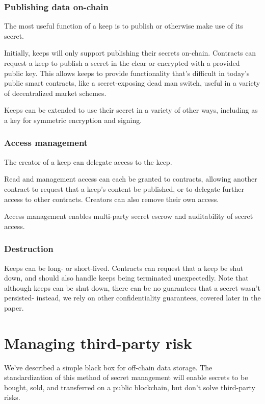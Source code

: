 \documentclass[11pt]{article}
\begin{document}
\subsubsection{Publishing data on-chain}

The most useful function of a keep is to publish or otherwise make use
of its secret.

Initially, keeps will only support publishing their secrets on-chain.
Contracts can request a keep to publish a secret in the clear or
encrypted with a provided public key. This allows keeps to provide
functionality that’s difficult in today’s public smart contracts, like
a secret-exposing dead man switch, useful in a variety of
decentralized market schemes.

Keeps can be extended to use their secret in a variety of other ways,
including as a key for symmetric encryption and signing.

\subsubsection{Access management}

The creator of a keep can delegate access to the keep.

Read and management access can each be granted to contracts, allowing
another contract to request that a keep’s content be published, or to
delegate further access to other contracts. Creators can also remove
their own access.

Access management  enables multi-party secret escrow and auditability
of secret access.

\subsubsection{Destruction}

Keeps can be long- or short-lived. Contracts can request that a keep
be shut down, and should also handle keeps being terminated
unexpectedly. Note that although keeps can be shut down, there can be
no guarantees that a secret wasn’t persisted- instead, we rely on
other confidentiality guarantees, covered later in the paper.

\section{Managing third-party risk}

We’ve described a simple black box for off-chain data storage. The
standardization of this method of secret management will enable
secrets to be bought, sold, and transferred on a public blockchain,
but don’t solve third-party risks.
\end{document}
